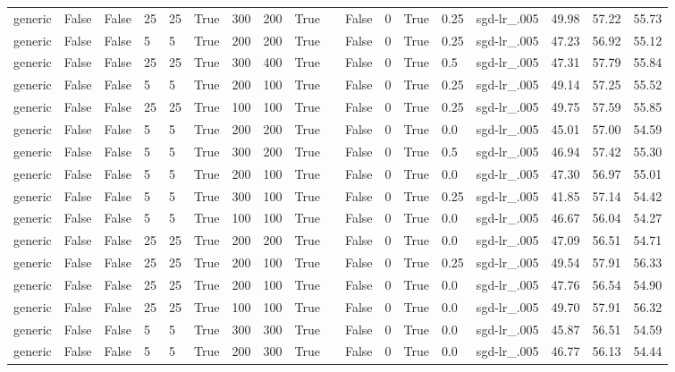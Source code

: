 \begin{adjustbox}{rotate=90,height=\textheight,width=\textwidth}
\begin{tabular}{llllllllllllllllll}
generic & False & False & 25 & 25 & True & 300 & 200 & True &  & False & 0 & True & 0.25 & sgd-lr\_.005 & 49.98 & 57.22 & 55.73\\
generic & False & False & 5 & 5 & True & 200 & 200 & True &  & False & 0 & True & 0.25 & sgd-lr\_.005 & 47.23 & 56.92 & 55.12\\
generic & False & False & 25 & 25 & True & 300 & 400 & True &  & False & 0 & True & 0.5 & sgd-lr\_.005 & 47.31 & 57.79 & 55.84\\
generic & False & False & 5 & 5 & True & 200 & 100 & True &  & False & 0 & True & 0.25 & sgd-lr\_.005 & 49.14 & 57.25 & 55.52\\
generic & False & False & 25 & 25 & True & 100 & 100 & True &  & False & 0 & True & 0.25 & sgd-lr\_.005 & 49.75 & 57.59 & 55.85\\
generic & False & False & 5 & 5 & True & 200 & 200 & True &  & False & 0 & True & 0.0 & sgd-lr\_.005 & 45.01 & 57.00 & 54.59\\
generic & False & False & 5 & 5 & True & 300 & 200 & True &  & False & 0 & True & 0.5 & sgd-lr\_.005 & 46.94 & 57.42 & 55.30\\
generic & False & False & 5 & 5 & True & 200 & 100 & True &  & False & 0 & True & 0.0 & sgd-lr\_.005 & 47.30 & 56.97 & 55.01\\
generic & False & False & 5 & 5 & True & 300 & 100 & True &  & False & 0 & True & 0.25 & sgd-lr\_.005 & 41.85 & 57.14 & 54.42\\
generic & False & False & 5 & 5 & True & 100 & 100 & True &  & False & 0 & True & 0.0 & sgd-lr\_.005 & 46.67 & 56.04 & 54.27\\
generic & False & False & 25 & 25 & True & 200 & 200 & True &  & False & 0 & True & 0.0 & sgd-lr\_.005 & 47.09 & 56.51 & 54.71\\
generic & False & False & 25 & 25 & True & 200 & 100 & True &  & False & 0 & True & 0.25 & sgd-lr\_.005 & 49.54 & 57.91 & 56.33\\
generic & False & False & 25 & 25 & True & 200 & 100 & True &  & False & 0 & True & 0.0 & sgd-lr\_.005 & 47.76 & 56.54 & 54.90\\
generic & False & False & 25 & 25 & True & 100 & 100 & True &  & False & 0 & True & 0.0 & sgd-lr\_.005 & 49.70 & 57.91 & 56.32\\
generic & False & False & 5 & 5 & True & 300 & 300 & True &  & False & 0 & True & 0.0 & sgd-lr\_.005 & 45.87 & 56.51 & 54.59\\
generic & False & False & 5 & 5 & True & 200 & 300 & True &  & False & 0 & True & 0.0 & sgd-lr\_.005 & 46.77 & 56.13 & 54.44\\

\end{tabular}
\end{adjustbox}
